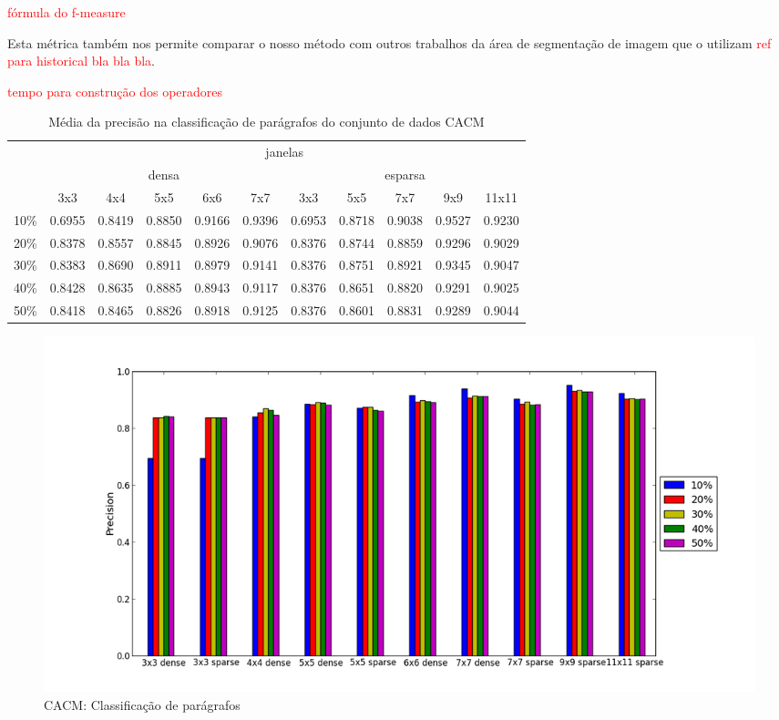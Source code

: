 \documentclass[a4paper,11pt]{article}
\newcommand{\TODO}[1]{\textcolor{red}{#1}}
\begin{document}
  \TODO{fórmula do f-measure}

  Esta métrica também nos permite comparar o nosso método com outros trabalhos da área de segmentação de imagem que o utilizam \TODO{ref para historical bla bla bla}.

  \TODO{tempo para construção dos operadores}

  \begin{center}
    \begin{table}[p]
      \caption{Média da precisão na classificação de parágrafos do conjunto de dados CACM}
      \begin{tabular}{ l | c c c c c || c c c c c | }
        \cline{2-11}
        & \multicolumn{10}{|c|}{janelas} \\
        \cline{2-11}
        & \multicolumn{5}{c||}{densa} & \multicolumn{5}{c|}{esparsa} \\
        \cline{2-11}
        & 3x3 & 4x4 & 5x5 & 6x6 & 7x7 & 3x3 & 5x5 & 7x7 & 9x9 & 11x11 \\
        \hline
        \multicolumn{1}{|l|}{10\%}& 0.6955& 0.8419& 0.8850& 0.9166& 0.9396& 0.6953& 0.8718& 0.9038& 0.9527& 0.9230\\
        \multicolumn{1}{|l|}{20\%}& 0.8378& 0.8557& 0.8845& 0.8926& 0.9076& 0.8376& 0.8744& 0.8859& 0.9296& 0.9029\\
        \multicolumn{1}{|l|}{30\%}& 0.8383& 0.8690& 0.8911& 0.8979& 0.9141& 0.8376& 0.8751& 0.8921& 0.9345& 0.9047\\
        \multicolumn{1}{|l|}{40\%}& 0.8428& 0.8635& 0.8885& 0.8943& 0.9117& 0.8376& 0.8651& 0.8820& 0.9291& 0.9025\\
        \multicolumn{1}{|l|}{50\%}& 0.8418& 0.8465& 0.8826& 0.8918& 0.9125& 0.8376& 0.8601& 0.8831& 0.9289& 0.9044\\
        \hline  
      \end{tabular}
    \end{table}
  \end{center}
    
  \begin{figure}[p]
    \centerline{\includegraphics[width=1.2\textwidth]{assets/experiment_charts/cacm_TextRegion_paragraph_precision.png}}
    \caption{CACM: Classificação de parágrafos}
    \label{fig:cacm_TextRegion_paragraph_precision}
  \end{figure}
\end{document}
